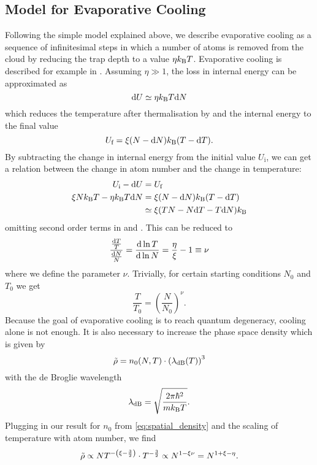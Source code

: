 \subsection{Model for Evaporative Cooling}
Following the simple model explained above, we describe evaporative cooling as a sequence of infinitesimal steps in which a number  of atoms is removed from the cloud by reducing the trap depth to a value $\eta k_\text{B} T$. Evaporative cooling is described for example in \cite{KETTERLE1996181}. Assuming $\eta \gg 1$, the loss in internal energy can be approximated as
\begin{equation}
    \text{d}U \simeq \eta k_\text{B} T \text{d}N
\end{equation}
which reduces the temperature after thermalisation by  and the internal energy to the final value
\begin{equation}
    U_\text{f} = \xi (N - \text{d}N) k_\text{B} (T - \text{d}T).
\end{equation}
By subtracting the change in internal energy from the initial value $U_\text{i}$, we can get a relation between the change in atom number and the change in temperature:
\begin{align}
    U_\text{i} - \text{d}U &= U_\text{f} \nonumber \\
    \xi N k_\text{B} T - \eta k_\text{B} T \text{d}N &= \xi (N - \text{d}N) k_\text{B} (T - \text{d}T) \nonumber \\
    &\simeq \xi (TN - N\text{d}T - T\text{d}N)k_\text{B} \nonumber
\end{align}
omitting second order terms in  and .
This can be reduced to
\begin{equation*}
    \frac{\frac{\text{d}T}{T}}{\frac{\text{d}N}{N}} = \frac{\text{d}\ln T}{\text{d}\ln N} = \frac{\eta}{\xi} -1 \equiv \nu
\end{equation*}
where we define the parameter $\nu$. Trivially, for certain starting conditions $N_0$ and $T_0$ we get
\begin{equation*}
    \frac{T}{T_0} = \left(\frac{N}{N_0}\right) ^\nu.
\end{equation*}
Because the goal of evaporative cooling is to reach quantum degeneracy, cooling alone is not enough. It is also necessary to increase the phase space density \PSD which is given by
\begin{equation*}
    \tilde{\rho} = n_0(N,T)\cdot \left(\lambda_\text{dB}(T)\right)^3
\end{equation*}
with the de Broglie wavelength
\begin{equation*}
    \lambda_\text{dB} = \sqrt{\frac{2\pi\hbar^2}{mk_\text{B} T}}.
\end{equation*}
Plugging in our result for $n_0$ from \cref{eq:spatial_density} and the scaling of temperature with atom number, we find
\begin{equation*}
    \tilde{\rho} \propto NT^{-\left(\xi - \frac{3}{2}\right)} \cdot T^{-\frac{3}{2}} \propto N^{1 - \xi\nu} = N^{1 + \xi - \eta}.
\end{equation*}


